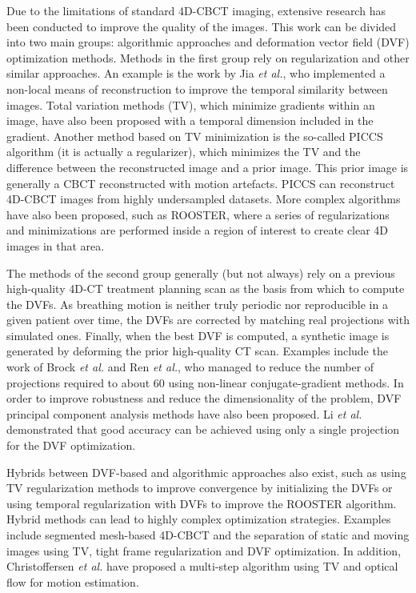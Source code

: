 Due to the limitations of standard 4D-CBCT imaging, extensive research has been conducted to improve the quality of the images.  This work can be divided into two main groups: algorithmic approaches and deformation vector field (DVF) optimization methods.  Methods in the first group rely on regularization and other similar approaches.  An example is the work by Jia \textit{et al.}\cite{jia2012}, who implemented a non-local means of reconstruction to improve the temporal similarity between images.  Total variation methods (TV)\cite{ASD_POCS}, which minimize gradients within an image, have also been proposed with a temporal dimension included in the gradient\cite{0031-9155-57-6-1517}.  Another method based on TV minimization is the so-called PICCS algorithm\cite{chen2008prior}\cite{0031-9155-53-20-006}\cite{chen2012time} (it is actually a regularizer), which minimizes the TV and the difference between the reconstructed image and a prior image.  This prior image is generally a CBCT reconstructed with motion artefacts.  PICCS can reconstruct 4D-CBCT images from highly undersampled datasets.  More complex algorithms have also been proposed, such as ROOSTER\cite{:/content/aapm/journal/medphys/41/2/10.1118/1.4860215}, where a series of regularizations and minimizations are performed inside a region of interest to create clear 4D images in that area.

The methods of the second group generally (but not always) rely on a previous high-quality 4D-CT treatment planning scan as the basis from which to compute the DVFs.  As breathing motion is neither truly periodic nor reproducible in a given patient over time, the DVFs are corrected by matching real projections with simulated ones.  Finally, when the best DVF is computed, a synthetic image is generated by deforming the prior high-quality CT scan.  Examples include the work of Brock \textit{et al.}\cite{brock2010} and Ren \textit{et al.}\cite{Ren20121584}, who managed to reduce the number of projections required to about 60 using non-linear conjugate-gradient methods.  In order to improve robustness and reduce the dimensionality of the problem, DVF principal component analysis methods have also been proposed\cite{zhang2010correction}.  Li \textit{et al.}\cite{:/content/aapm/journal/medphys/37/6/10.1118/1.3426002}\cite{:/content/aapm/journal/medphys/38/5/10.1118/1.3582693} demonstrated that good accuracy can be achieved using only a single projection for the DVF optimization.

Hybrids between DVF-based and algorithmic approaches also exist, such as using TV regularization methods to improve convergence by initializing the DVFs\cite{wang2012high} or using temporal regularization with DVFs to improve the ROOSTER algorithm\cite{mory2016motion}.  Hybrid methods can lead to highly complex optimization strategies.  Examples include segmented mesh-based 4D-CBCT\cite{0031-9155-61-3-996} and the separation of static and moving images using TV, tight frame regularization and DVF optimization\cite{0031-9155-56-11-002}.  In addition, Christoffersen \textit{et al.}\cite{christoffersen2013registration} have proposed a multi-step algorithm using TV and optical flow for motion estimation.


